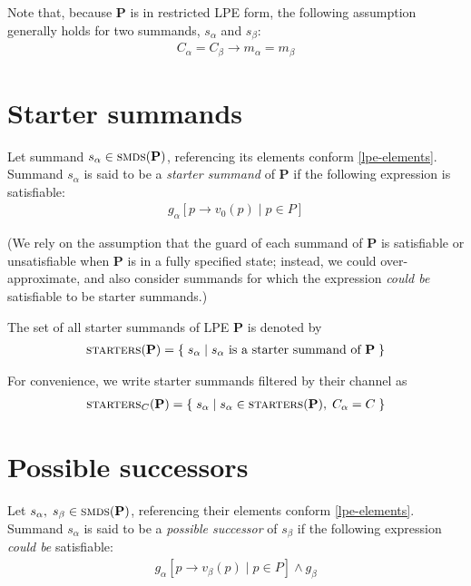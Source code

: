 Note that, because $\mathbf{P}$ is in restricted LPE form, the following assumption generally holds for two summands, $s_\alpha$ and $s_\beta$:
\begin{align*}
C_\alpha = C_\beta \longrightarrow m_\alpha = m_\beta
\end{align*}

\section{Starter summands}

Let summand $s_\alpha \in \textsc{smds}(\mathbf{P})$, referencing its elements conform \ref{lpe-elements}.
Summand $s_\alpha$ is said to be a \emph{starter summand} of $\mathbf{P}$ if the following expression is satisfiable:
\begin{align*}
{g_\alpha}[p \rightarrow v_0(p) \;|\; p \in P]
\end{align*}

(We rely on the assumption that the guard of each summand of $\mathbf{P}$ is satisfiable or unsatisfiable when $\mathbf{P}$ is in a fully specified state; instead, we could over-approximate, and also consider summands for which the expression \emph{could be} satisfiable to be starter summands.)

\vspace{2mm}

The set of all starter summands of LPE $\mathbf{P}$ is denoted by
\begin{align*}
\textsc{starters}(\mathbf{P}) = \{\;s_\alpha\;|\;\text{$s_\alpha$ is a starter summand of $\mathbf{P}$}\;\}
\end{align*}

For convenience, we write starter summands filtered by their channel as
\begin{align*}
\textsc{starters}_{C}(\mathbf{P}) = \{\;s_\alpha\;|\;s_\alpha \in \textsc{starters}(\mathbf{P}),\; C_\alpha = C\;\}
\end{align*}

\section{Possible successors} \label{possible-successors}

Let $s_\alpha,\; s_\beta \in \textsc{smds}(\mathbf{P})$, referencing their elements conform \ref{lpe-elements}.
Summand $s_\alpha$ is said to be a \emph{possible successor} of $s_\beta$ if the following expression \emph{could be} satisfiable:
\begin{align*}
{g_\alpha}[p \rightarrow v_\beta(p) \;|\; p \in P] \land g_\beta
\end{align*}

